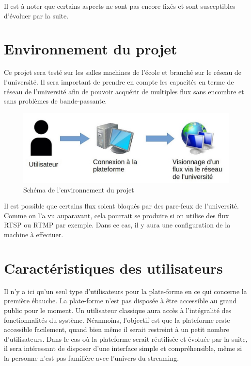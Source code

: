\documentclass{polytech/polytech}
\begin{document}
Il est à noter que certains aspects ne sont pas encore fixés et sont susceptibles d’évoluer par la suite.

\section{Environnement du projet}

Ce projet sera testé sur les salles machines de l’école et branché sur le réseau de l’université. Il sera important de prendre en compte les capacités en terme de réseau de l’université afin de pouvoir acquérir de multiples flux sans encombre et sans problèmes de bande-passante.

\begin{figure}
	\includegraphics[scale=0.75]{images/environnement}
	\caption{Schéma de l'environnement du projet}
	\label{fig:environnement}
\end{figure}

Il est possible que certains flux soient bloqués par des pare-feux de l’université. Comme on l’a vu auparavant, cela pourrait se produire si on utilise des flux RTSP ou RTMP par exemple. Dans ce cas, il y aura une configuration de la machine à effectuer.

\section{Caractéristiques des utilisateurs}


Il n’y a ici qu’un seul type d’utilisateurs pour la plate-forme en ce qui concerne la première ébauche. La plate-forme n’est pas disposée à être accessible au grand public pour le moment. Un utilisateur classique aura accès à l’intégralité des fonctionnalités du système. Néanmoins, l’objectif est que la plateforme reste accessible facilement, quand bien même il serait restreint à un petit nombre d’utilisateurs. Dans le cas où la plateforme serait réutilisée et évoluée par la suite, il sera intéressant de disposer d’une interface simple et compréhensible, même si la personne n’est pas familière avec l’univers du streaming.
\end{document}

